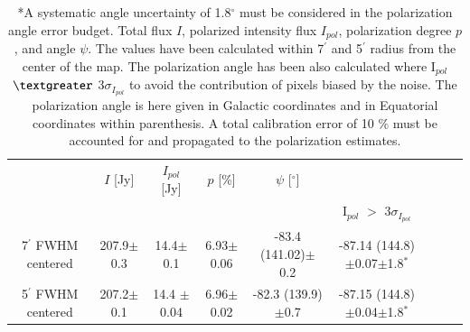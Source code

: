\documentclass[twocolumn,traditabstract]{aa}
\begin{document}
\begin{table}
  \centering
      \begin{tabular}{ccccccccc}
      \hline
      \hline
       & $I$ [Jy] & $I_{pol}$ [Jy] & $p$ [\%] &  $\psi$ [$^\circ$] &\\      
      &  &  &  & & I$_{pol}$ $>$ 3$\sigma_{I_{pol}}$ \\
      \hline
    7$^{\prime}$ FWHM centered   & 207.9$\pm$0.3  & 14.4$\pm$0.1 & 6.93$\pm$0.06 & -83.4 (141.02)$\pm$0.2 & -87.14 (144.8)$\pm$0.07$\pm$1.8$^*$\\ 
 
    5$^{\prime}$ FWHM centered & 207.2$\pm$0.1  & 14.4 $\pm$0.04 & 6.96$\pm$0.02 & -82.3 (139.9)$\pm$0.7 & -87.15 (144.8)$\pm$0.04$\pm$1.8$^*$ \\ 
     	      
              
             
                \hline            
    \hline   
    \end{tabular}
   \caption{ 
   	*A systematic angle uncertainty of 1.8$^{\circ}$ must be considered in the polarization angle error budget.
   	 Total flux $I$, polarized intensity flux $I_{pol}$,
     polarization degree $p$, and angle $\psi$. The values have been calculated within 7$^{\prime}$ and 5$^{\prime}$ radius from the center of the map. The polarization angle has been also calculated where I$_{pol}$ $\textgreater$ 3$\sigma_{I_{pol}}$ to avoid the contribution of pixels biased by the noise.
     The polarization angle is here given in Galactic coordinates and in Equatorial coordinates within parenthesis. 
     A total calibration error of 10 $\%$ must be accounted for and propagated to the
     polarization estimates.
    }
    \label{tab:crab_results}
 \end{table}
 
\end{document}
